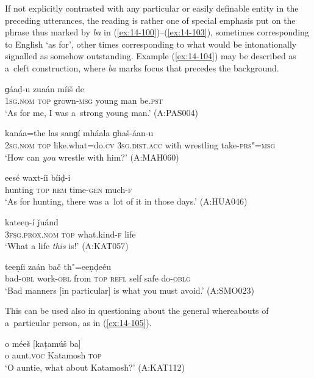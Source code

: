 If not explicitly contrasted with any particular or easily definable entity in the preceding utterances, the reading is rather one of special emphasis put on the phrase thus marked by \textit{ba} in (\ref{ex:14-100})--(\ref{ex:14-103}), sometimes corresponding to English `as for', other times corresponding to what would be intonationally signalled as somehow outstanding. Example (\ref{ex:14-104}) may be described as a~cleft construction, where \textit{ba} marks focus that precedes the background.

\begin{exe}
\ex
\label{ex:14-100}
\gll [ma ba] ɡáaḍ-u zuaán míiš de \\
\textsc{1sg.nom} \textsc{top} grown-\textsc{msg} young man be.\textsc{pst}  \\
\glt `As for me, I was a~strong young man.' (A:PAS004)

\ex
\label{ex:14-101}
\gll [tu ba] kanáa=the las sanɡí  mháala ɡhaš-áan-u\\
\textsc{2sg.nom} \textsc{top} like.what=do.\textsc{cv} \textsc{3sg.dist.acc} with wrestling take-\textsc{prs"=msg}\\
\glt `How can \textit{you} wrestle with him?' (A:MAH060)

\ex
\label{ex:14-102}
\gll [neečíir ba] eesé waxt-íi bíiḍ-i \\
hunting \textsc{top} \textsc{rem} time-\textsc{gen} much-\textsc{f } \\
\glt `As for hunting, there was a~lot of it in those days.' (A:HUA046)

\ex
\label{ex:14-103}
\gll [aní ba] kateeṇ-í ǰuánd \\
\textsc{3fsg.prox.nom} \textsc{top} what.kind-\textsc{f} life  \\
\glt `What a life \textit{this} is!' (A:KAT057)

\ex
\label{ex:14-104}
 teeṇíi zaán bač th"=eeṇḍeéu \\
bad-\textsc{obl} work-\textsc{obl } from \textsc{top} \textsc{refl} self safe do-\textsc{oblg} \\
\glt `Bad manners [in particular] is what you must avoid.' (A:SMO023)
\end{exe}

This can be used also in questioning about the general whereabouts of a~particular person, as in (\ref{ex:14-105}).

\begin{exe}
\ex
\label{ex:14-105}
\gll o méeš [kaṭamúš ba]\\
o aunt.\textsc{voc} Katamosh \textsc{top}\\
\glt `O auntie, what about Katamosh?' (A:KAT112)
\end{exe}

